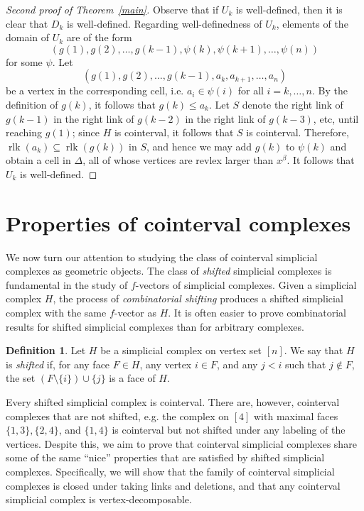 \documentclass[11pt]{amsart}
\theoremstyle{definition}
\newtheorem{definition}[theorem]{Definition}
\numberwithin{equation}{section}
\theoremstyle{remark}
\numberwithin{equation}{section}
\begin{document}
\begin{proof}[Second proof of Theorem~\ref{main}]
Observe that if $U_k$ is well-defined, then it is clear that $D_k$ is well-defined.
Regarding well-definedness of $U_k$, elements of the domain of $U_k$ are of the form
\[\left( g(1),g(2),\ldots,g(k-1),\psi(k),\psi(k+1),\ldots,\psi(n)\right)\]
for some $\psi$.
Let 
\[\left( g(1),g(2),\ldots,g(k-1),a_k,a_{k+1},\ldots,a_n\right)\]
be a vertex in the corresponding cell, i.e. $a_i\in \psi(i)$ for all $i=k,\ldots,n$.
By the definition of $g(k)$, it follows that $g(k)\leq a_k$.
Let $S$ denote the right link of $g(k-1)$ in the right link of $g(k-2)$ in the right link of $g(k-3)$, etc, until reaching $g(1)$; since $H$ is cointerval, it follows that $S$ is cointerval.
Therefore, $\operatorname{rlk}(a_k)\subseteq \operatorname{rlk}(g(k))$ in $S$, and hence we may add $g(k)$ to $\psi(k)$ and obtain a cell in $\Delta$, all of whose vertices are revlex larger than $x^\beta$.
It follows that $U_k$ is well-defined.

\end{proof}

\section{Properties of cointerval complexes}\label{properties}

We now turn our attention to studying the class of cointerval simplicial complexes as geometric objects.  
The class of \textit{shifted} simplicial complexes \cite{Erdos-Ko-Rado, Kalai} is fundamental in the study of $f$-vectors of simplicial complexes.
Given a simplicial complex $H$, the process of \textit{combinatorial shifting} \cite{Erdos-Ko-Rado} produces a shifted simplicial complex with the same $f$-vector as $H$.  
It is often easier to prove combinatorial results for shifted simplicial complexes than for arbitrary complexes.

\begin{definition}
Let $H$ be a simplicial complex on vertex set $[n]$. 
We say that $H$ is \textit{shifted} if, for any face $F \in H$, any vertex $i \in F$, and any $j < i$ such that $j \notin F$, the set $(F \setminus \{i\})\cup\{j\}$ is a face of $H$. 
\end{definition}

Every shifted simplicial complex is cointerval.  
There are, however, cointerval complexes that are not shifted, e.g. the complex on $[4]$ with maximal faces $\{1,3\},\{2,4\}$, and $\{1,4\}$ is cointerval but not shifted under any labeling of the vertices.
Despite this, we aim to prove that cointerval simplicial complexes share some of the same ``nice'' properties that are satisfied by shifted simplicial complexes.  
Specifically, we will show that the family of cointerval simplicial complexes is closed under taking links and deletions, and that any cointerval simplicial complex is vertex-decomposable.
\end{document}
